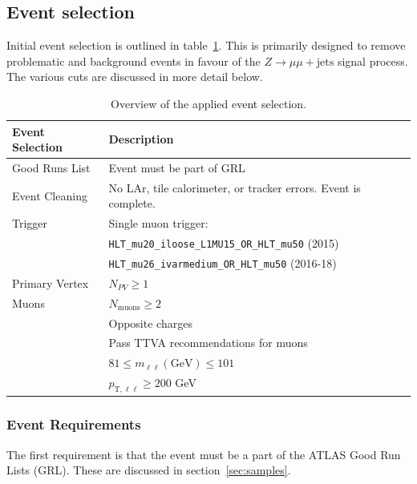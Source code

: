 \subsection{Event selection}
\label{sec:selection}

Initial event selection is outlined in table~\ref{lab:eventsel}. This is primarily designed to remove problematic and background events in favour of the $Z\rightarrow\mu\mu + \text{jets}$ signal process. The various cuts are discussed in more detail below.

\begin{table}[h!]
    \centering
    \begin{tabular}{l|l}
         \hline
    \textbf{Event Selection} & \textbf{Description} \\ \hline
    Good Runs List & Event must be part of GRL \\ \hline
    Event Cleaning & No LAr, tile calorimeter, or tracker errors. Event is complete. \\ \hline
    Trigger & Single muon trigger: \\
    & \texttt{HLT\_mu20\_iloose\_L1MU15\_OR\_HLT\_mu50} (2015) \\
    & \texttt{HLT\_mu26\_ivarmedium\_OR\_HLT\_mu50} (2016-18) \\ \hline
    Primary Vertex & $N_{PV}\geq1$ \\ \hline
    Muons & $N_{\text{muons}}\geq2$ \\
          & Opposite charges \\
          & Pass TTVA recommendations for muons \\
          & $81\leq m_{\ell\ell} (\text{GeV})\leq 101$ \\
          & $p_{\text{T},\ell\ell}\geq200$ GeV \\ \hline
    \end{tabular}
    \caption{Overview of the applied event selection.}
    \label{lab:eventsel}
\end{table}

\subsubsection{Event Requirements}
The first requirement is that the event must be a part of the ATLAS Good Run Lists (GRL). These are discussed in section~\ref{sec:samples}.

